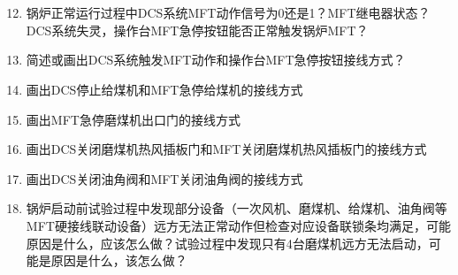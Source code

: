 \documentclass{book}
\begin{document}
\section{}
\begin{enumerate}
	\setcounter{enumi}{11}
	\item 锅炉正常运行过程中DCS系统MFT动作信号为0还是1？MFT继电器状态？DCS系统失灵，操作台MFT急停按钮能否正常触发锅炉MFT？
\item 简述或画出DCS系统触发MFT动作和操作台MFT急停按钮接线方式？

	\item 画出DCS停止给煤机和MFT急停给煤机的接线方式
	\item 画出MFT急停磨煤机出口门的接线方式

\item 画出DCS关闭磨煤机热风插板门和MFT关闭磨煤机热风插板门的接线方式
\item 画出DCS关闭油角阀和MFT关闭油角阀的接线方式
\item 锅炉启动前试验过程中发现部分设备（一次风机、磨煤机、给煤机、油角阀等MFT硬接线联动设备）远方无法正常动作但检查对应设备联锁条均满足，可能原因是什么，应该怎么做？试验过程中发现只有4台磨煤机远方无法启动，可能是原因是什么，该怎么做？
\end{enumerate}
		\ifx \allfiles \undefined
\end{document}
